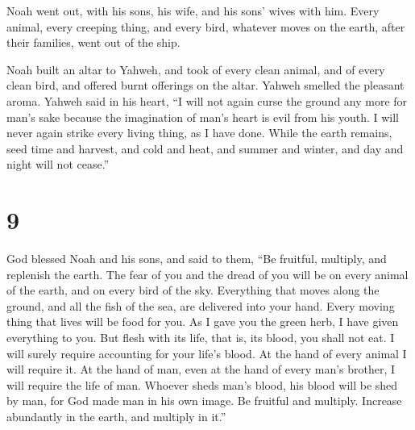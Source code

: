  Noah went out, with his sons, his wife, and his sons'
wives with him.  Every animal, every creeping thing, and
every bird, whatever moves on the earth, after their families, went out
of the ship.

 Noah built an altar to Yahweh, and took of every clean
animal, and of every clean bird, and offered burnt offerings on the
altar.  Yahweh smelled the pleasant aroma. Yahweh said in
his heart, ``I will not again curse the ground any more for man's sake
because the imagination of man's heart is evil from his youth. I will
never again strike every living thing, as I have done. 
While the earth remains, seed time and harvest, and cold and heat, and
summer and winter, and day and night will not cease.''

\hypertarget{section-8}{%
\section{9}\label{section-8}}

 God blessed Noah and his sons, and said to them, ``Be
fruitful, multiply, and replenish the earth.  The fear of
you and the dread of you will be on every animal of the earth, and on
every bird of the sky. Everything that moves along the ground, and all
the fish of the sea, are delivered into your hand.  Every
moving thing that lives will be food for you. As I gave you the green
herb, I have given everything to you.  But flesh with its
life, that is, its blood, you shall not eat.  I will surely
require accounting for your life's blood. At the hand of every animal I
will require it. At the hand of man, even at the hand of every man's
brother, I will require the life of man.  Whoever sheds
man's blood, his blood will be shed by man, for God made man in his own
image.  Be fruitful and multiply. Increase abundantly in the
earth, and multiply in it.''

